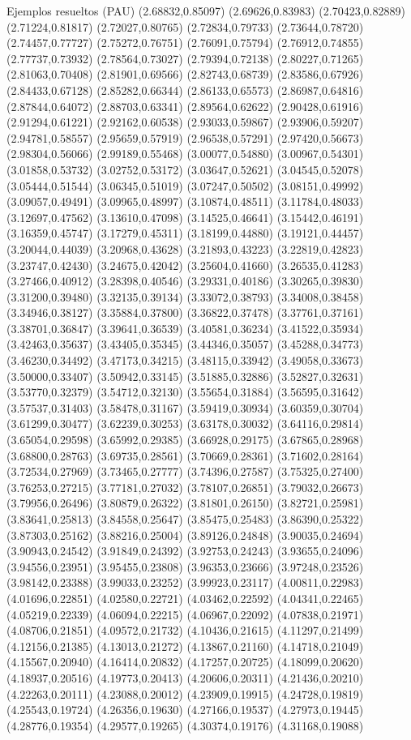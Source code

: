 \documentclass[11pt,a4paper]{article}
\begin{document}
\begin{fmex}{Ejemplos resueltos (PAU)}
(2.68832,0.85097) (2.69626,0.83983) (2.70423,0.82889) (2.71224,0.81817) (2.72027,0.80765) (2.72834,0.79733) (2.73644,0.78720) (2.74457,0.77727) (2.75272,0.76751) (2.76091,0.75794) (2.76912,0.74855) (2.77737,0.73932) (2.78564,0.73027) (2.79394,0.72138) (2.80227,0.71265) (2.81063,0.70408) (2.81901,0.69566) (2.82743,0.68739) (2.83586,0.67926) (2.84433,0.67128) (2.85282,0.66344) (2.86133,0.65573) (2.86987,0.64816) (2.87844,0.64072) (2.88703,0.63341) (2.89564,0.62622) (2.90428,0.61916) (2.91294,0.61221) (2.92162,0.60538) (2.93033,0.59867) (2.93906,0.59207) (2.94781,0.58557) (2.95659,0.57919) (2.96538,0.57291) (2.97420,0.56673) (2.98304,0.56066) (2.99189,0.55468) (3.00077,0.54880) (3.00967,0.54301) (3.01858,0.53732) (3.02752,0.53172) (3.03647,0.52621) (3.04545,0.52078) (3.05444,0.51544) (3.06345,0.51019) (3.07247,0.50502) (3.08151,0.49992) (3.09057,0.49491) (3.09965,0.48997) (3.10874,0.48511) (3.11784,0.48033) (3.12697,0.47562) (3.13610,0.47098) (3.14525,0.46641) (3.15442,0.46191) (3.16359,0.45747) (3.17279,0.45311) (3.18199,0.44880) (3.19121,0.44457) (3.20044,0.44039) (3.20968,0.43628) (3.21893,0.43223) (3.22819,0.42823) (3.23747,0.42430) (3.24675,0.42042) (3.25604,0.41660) (3.26535,0.41283) (3.27466,0.40912) (3.28398,0.40546) (3.29331,0.40186) (3.30265,0.39830) (3.31200,0.39480) (3.32135,0.39134) (3.33072,0.38793) (3.34008,0.38458) (3.34946,0.38127) (3.35884,0.37800) (3.36822,0.37478) (3.37761,0.37161) (3.38701,0.36847) (3.39641,0.36539) (3.40581,0.36234) (3.41522,0.35934) (3.42463,0.35637) (3.43405,0.35345) (3.44346,0.35057) (3.45288,0.34773) (3.46230,0.34492) (3.47173,0.34215) (3.48115,0.33942) (3.49058,0.33673) (3.50000,0.33407) (3.50942,0.33145) (3.51885,0.32886) (3.52827,0.32631) (3.53770,0.32379) (3.54712,0.32130) (3.55654,0.31884) (3.56595,0.31642) (3.57537,0.31403) (3.58478,0.31167) (3.59419,0.30934) (3.60359,0.30704) (3.61299,0.30477) (3.62239,0.30253) (3.63178,0.30032) (3.64116,0.29814) (3.65054,0.29598) (3.65992,0.29385) (3.66928,0.29175) (3.67865,0.28968) (3.68800,0.28763) (3.69735,0.28561) (3.70669,0.28361) (3.71602,0.28164) (3.72534,0.27969) (3.73465,0.27777) (3.74396,0.27587) (3.75325,0.27400) (3.76253,0.27215) (3.77181,0.27032) (3.78107,0.26851) (3.79032,0.26673) (3.79956,0.26496) (3.80879,0.26322) (3.81801,0.26150) (3.82721,0.25981) (3.83641,0.25813) (3.84558,0.25647) (3.85475,0.25483) (3.86390,0.25322) (3.87303,0.25162) (3.88216,0.25004) (3.89126,0.24848) (3.90035,0.24694) (3.90943,0.24542) (3.91849,0.24392) (3.92753,0.24243) (3.93655,0.24096) (3.94556,0.23951) (3.95455,0.23808) (3.96353,0.23666) (3.97248,0.23526) (3.98142,0.23388) (3.99033,0.23252) (3.99923,0.23117) (4.00811,0.22983) (4.01696,0.22851) (4.02580,0.22721) (4.03462,0.22592) (4.04341,0.22465) (4.05219,0.22339) (4.06094,0.22215) (4.06967,0.22092) (4.07838,0.21971) (4.08706,0.21851) (4.09572,0.21732) (4.10436,0.21615) (4.11297,0.21499) (4.12156,0.21385) (4.13013,0.21272) (4.13867,0.21160) (4.14718,0.21049) (4.15567,0.20940) (4.16414,0.20832) (4.17257,0.20725) (4.18099,0.20620) (4.18937,0.20516) (4.19773,0.20413) (4.20606,0.20311) (4.21436,0.20210) (4.22263,0.20111) (4.23088,0.20012) (4.23909,0.19915) (4.24728,0.19819) (4.25543,0.19724) (4.26356,0.19630) (4.27166,0.19537) (4.27973,0.19445) (4.28776,0.19354) (4.29577,0.19265) (4.30374,0.19176) (4.31168,0.19088) 
\end{fmex}
\end{document}
